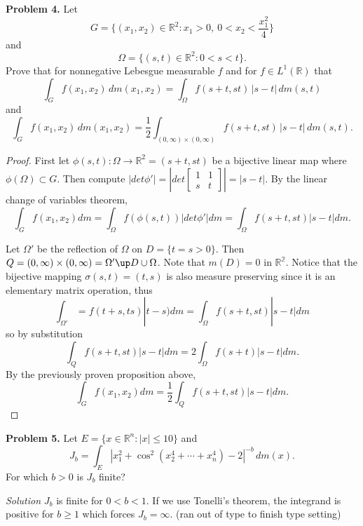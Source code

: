 \documentclass[11pt]{article}
\newcommand{\R}{\mathbb{R}}
\begin{document}
\noindent\textbf{Problem 4.}
Let
\[
    G = \Big\{ (x_1, x_2) \in \R^2 : x_1 > 0,\ 0 < x_2 < \frac{x_1^2}{4} \Big\}
\]
and
\[
    \Omega = \{ (s, t) \in \R^2 : 0 < s < t \}.
\]
Prove that for nonnegative Lebesgue measurable $f$ and for $f \in L^1(\R)$ that
\[
    \int_G f(x_1, x_2)\,dm(x_1, x_2) = \int_\Omega f(s + t, st)\,|s - t|\,dm(s, t)
\]
and
\[
    \int_G f(x_1, x_2)\,dm(x_1, x_2) = \frac{1}{2} \int_{(0, \infty) \times (0, \infty)} f(s + t, st)\,|s - t|\,dm(s, t).
\]

\bigskip
\begin{proof}
	First let $\phi(s,t): \Omega \to \mathbb{R}^2 = (s +t, st)$ be a bijective linear map where $\phi(\Omega) \subset G$. Then compute $|det \phi'| = |det \begin{bmatrix} 1 & 1 \\ s & t \end{bmatrix}| = |s-t|.$ By the linear change of variables theorem, 
	$$\int_G f(x_1, x_2) dm = \int_\Omega f(\phi(s, t))|det \phi'| dm = \int_\Omega f(s+t, st) |s-t| dm.$$

	\medskip
	\noindent Let $\Omega'$ be the reflection of $\Omega$ on $D = \{t=s >0\}$. Then $Q = (0, \infty) \times (0, \infty) = \Omega' \up D \cup \Omega$. Note that $m(D) = 0$ in $\mathbb{R^2}$. Notice that the bijective mapping $\sigma(s,t) = (t,s)$ is also measure preserving since it is an elementary matrix operation, thus 
	$$\int_{\Omega'} = f(t+s, ts)|t-s)dm = \int_\Omega f(s+t, st)|s-t|dm$$
	so by substitution
	$$\int_Q f(s+t, st) |s-t|dm = 2\int_\Omega f(s+t) |s-t|dm.$$ By the previously proven proposition above,
	$$ \int_G f(x_1, x_2) dm = \frac{1}{2} \int_Q f(s+t, st) |s-t|dm.$$
\end{proof}

\noindent\textbf{Problem 5.}
Let $E = \{ x \in \R^n : |x| \leq 10 \}$ and
\[
    J_b = \int_E |x_1^2 + \cos^2(x_2^4 + \cdots + x_n^4) - 2|^{-b}\,dm(x).
\]
For which $b > 0$ is $J_b$ finite?

\bigskip
\noindent\textit{Solution}
$J_b$ is finite for $0<b<1$. If we use Tonelli's theorem, the integrand is positive for $b \geq 1$ which forces $J_b = \infty$.  (ran out of type to finish type setting)
\end{document}
